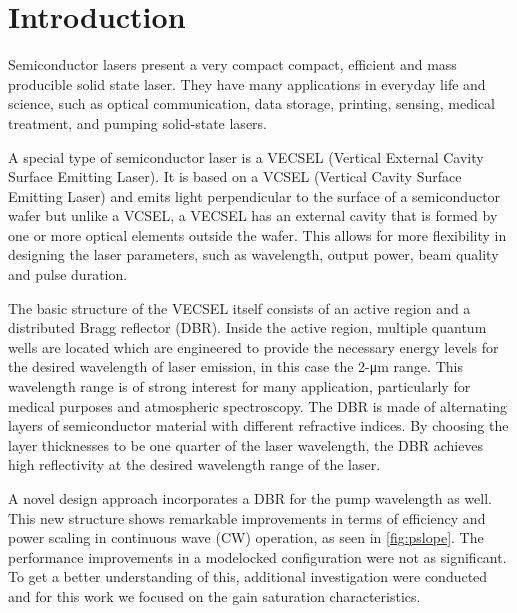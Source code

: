 \chapter{Introduction}\label{chapter:introduction}

Semiconductor lasers present a very compact compact, efficient and mass producible solid state laser. They have many applications in everyday life and science, such as optical communication, data storage, printing, sensing, medical treatment, and pumping solid-state lasers.

A special type of semiconductor laser is a VECSEL (Vertical External Cavity Surface Emitting Laser). It is based on a VCSEL (Vertical Cavity Surface Emitting Laser) and emits light perpendicular to the surface of a semiconductor wafer but unlike a VCSEL,  a VECSEL has an external cavity that is formed by one or more optical elements outside the wafer. This allows for more flexibility in designing the laser parameters, such as wavelength, output power, beam quality and pulse duration.

The basic structure of the VECSEL itself consists of an active region and a distributed Bragg reflector (DBR). Inside the active region, multiple quantum wells are located which are engineered to provide the necessary energy levels for the desired wavelength of laser emission, in this case the 2-\unit{\um} range. This wavelength range is of strong interest for many application, particularly for medical purposes and atmospheric spectroscopy. The DBR is made of alternating layers of semiconductor material with different refractive indices. By choosing the layer thicknesses to be one quarter of the laser wavelength, the DBR achieves high reflectivity at the desired wavelength range of the laser. 

A novel design approach incorporates a DBR for the pump wavelength as well. This new structure shows remarkable improvements in terms of efficiency and power scaling in continuous wave (CW) operation, as seen in \cref{fig:pslope}. The performance improvements in a modelocked configuration were not as significant. To get a better understanding of this, additional investigation were conducted and for this work we focused on the gain saturation characteristics.


